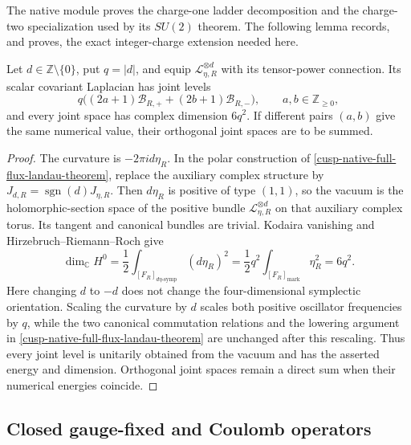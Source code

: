 The native module proves the charge-one ladder decomposition and the
charge-two specialization used by its \(SU(2)\) theorem.  The following
lemma records, and proves, the exact integer-charge extension needed here.

\begin{lemma}
\label{cusp-native-full-flux-suN-charge-d-Landau}
Let \(d\in\mathbb Z\setminus\{0\}\), put \(q=|d|\), and equip
\(\mathscr L_{\eta,R}^{\otimes d}\) with its tensor-power connection.  Its
scalar covariant Laplacian has joint levels
\begin{equation}
 q\bigl((2a+1)\mathcal B_{R,+}+(2b+1)\mathcal B_{R,-}\bigr),
 \qquad a,b\in\mathbb Z_{\ge0},
 \label{cusp-native-full-flux-suN-charge-d-levels}
\end{equation}
and every joint space has complex dimension \(6q^2\).  If different pairs
\((a,b)\) give the same numerical value, their orthogonal joint spaces are
to be summed.
\end{lemma}

\begin{proof}
The curvature is \(-2\pi i d\eta_R\).  In the polar construction of
\cref{cusp-native-full-flux-landau-theorem}, replace the auxiliary complex
structure by
\(J_{d,R}=\operatorname{sgn}(d)J_{\eta,R}\).  Then \(d\eta_R\) is positive
of type \((1,1)\), so the vacuum is the holomorphic-section space of the
positive bundle \(\mathscr L_{\eta,R}^{\otimes d}\) on that auxiliary
complex torus.  Its tangent and canonical bundles are trivial.  Kodaira
vanishing and Hirzebruch--Riemann--Roch give
\[
 \dim_{\mathbb C}H^0
 =\frac12\int_{[F_R]_{d\eta\text{-}\mathrm{symp}}}(d\eta_R)^2
 =\frac12q^2\int_{[F_R]_{\mathrm{mark}}}\eta_R^2
 =6q^2.
\]
Here changing \(d\) to \(-d\) does not change the four-dimensional
symplectic orientation.  Scaling the curvature by \(d\) scales both
positive oscillator frequencies by \(q\), while the two canonical
commutation relations and the lowering argument in
\cref{cusp-native-full-flux-landau-theorem} are unchanged after this
rescaling.  Thus every joint level is unitarily obtained from the vacuum and
has the asserted energy and dimension.  Orthogonal joint spaces remain a
direct sum when their numerical energies coincide.
\end{proof}

\subsection{Closed gauge-fixed and Coulomb operators}

